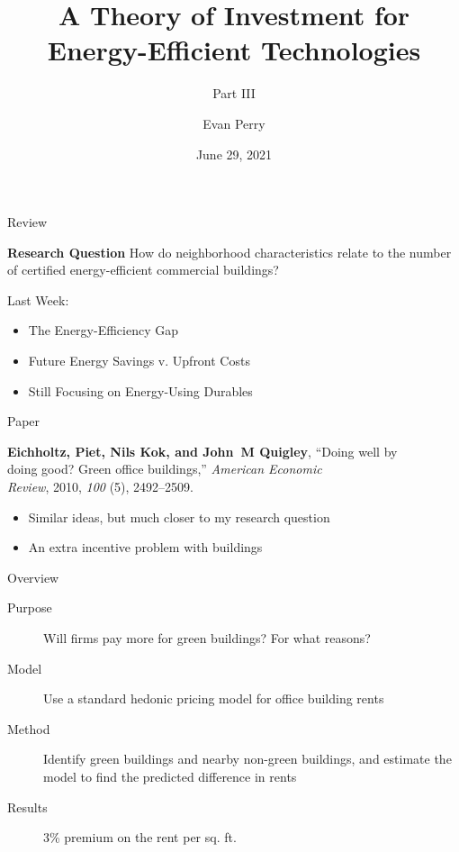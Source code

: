 \documentclass[11pt]{beamer}
\title{A Theory of Investment for\\ Energy-Efficient Technologies}
\subtitle{Part III}
\author{Evan Perry}
\institute{Spellman Program}
\date{June 29, 2021}
\begin{document}
\maketitlepage

\begin{frame}{Review}

\begin{exampleblock}{\large\textbf{Research Question}}
How do neighborhood characteristics relate to the number of certified energy-efficient commercial buildings?
\end{exampleblock}

\vfill
Last Week:
\begin{itemize}
	\item The Energy-Efficiency Gap
	\item Future Energy Savings v. Upfront Costs
	\item Still Focusing on Energy-Using Durables
\end{itemize}
\end{frame}

\begin{frame}{Paper}

{\bf Eichholtz, Piet, Nils Kok, and John~M Quigley}, ``Doing well by\\
\quad doing good? Green office buildings,'' {\it American Economic\\ \quad Review}, 2010, {\it
  100} (5), 2492--2509.

\vfill
\begin{itemize}
	\item Similar ideas, but much closer to my research question
	\item An extra incentive problem with buildings
\end{itemize}

\end{frame}


\begin{frame}{Overview}

\begin{description}
	\item[Purpose] Will firms pay more for green buildings? For what reasons?
	\vfill
	
	\item[Model] Use a standard hedonic pricing model for office building rents 
	\vfill
	
	\item[Method] Identify green buildings and nearby non-green buildings, and estimate the model to find the predicted difference in rents
	\vfill
	
	\item[Results] 3\% premium on the rent per sq. ft.
\end{description}

\end{frame}
\end{document}
